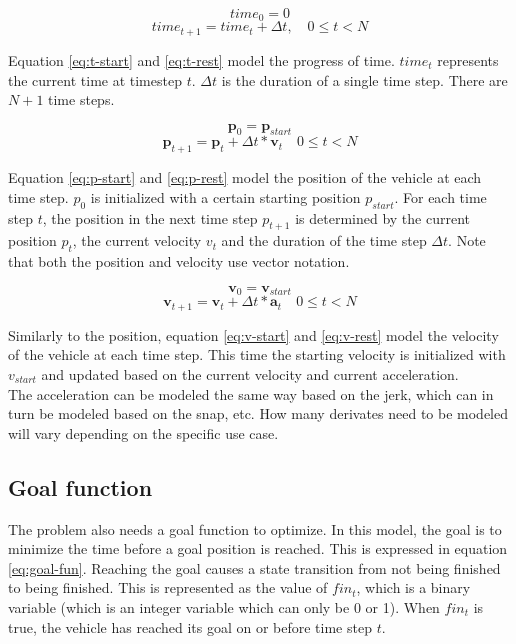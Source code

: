 \begin{equation}
\label{eq:t-start}
time_0 = 0
\end{equation}
\begin{equation}
\label{eq:t-rest}
time_{t+1} = time_{t} + \Delta t,  \quad 0 \leq t < N
\end{equation}

Equation \ref{eq:t-start} and \ref{eq:t-rest} model the progress of time. $time_t$ represents the current time at timestep $t$. $\Delta t$ is the duration of a single time step. There are $N + 1$ time steps.


\begin{equation}
\label{eq:p-start}
\boldsymbol{p}_0 = \boldsymbol{p}_{start}
\end{equation}
\begin{equation}
\label{eq:p-rest}
\boldsymbol{p}_{t+1} = \boldsymbol{p}_{t} + \Delta t * \boldsymbol{v}_{t}  \quad 0 \leq t < N
\end{equation}

Equation \ref{eq:p-start} and \ref{eq:p-rest} model the position of the vehicle at each time step. $p_0$ is initialized with a certain starting position $p_{start}$. For each time step $t$, the position in the next time step $p_{t+1}$ is determined by the current position $p_t$, the current velocity $v_t$ and the duration of the time step $\Delta t$. Note that both the position and velocity use vector notation.

\begin{equation}
\label{eq:v-start}
\boldsymbol{v}_0 =\boldsymbol{v}_{start}
\end{equation}
\begin{equation}
\label{eq:v-rest}
\boldsymbol{v}_{t+1} =\boldsymbol{v}_{t} + \Delta t * \boldsymbol{a}_{t}  \quad 0 \leq t < N
\end{equation}

Similarly to the position, equation \ref{eq:v-start} and \ref{eq:v-rest} model the velocity of the vehicle at each time step. This time the starting velocity is initialized with $v_{start}$ and updated based on the current velocity and current acceleration.\\
The acceleration can be modeled the same way based on the jerk, which can in turn be modeled based on the snap, etc. How many derivates need to be modeled will vary depending on the specific use case.

\subsection{Goal function}
The problem also needs a goal function to optimize. In this model, the goal is to minimize the time before a goal position is reached. This is expressed in equation \ref{eq:goal-fun}. Reaching the goal causes a state transition from not being finished to being finished. This is represented as the value of $fin_t$, which is a binary variable (which is an integer variable which can only be 0 or 1). When $fin_t$ is true, the vehicle has reached its goal on or before time step $t$.

